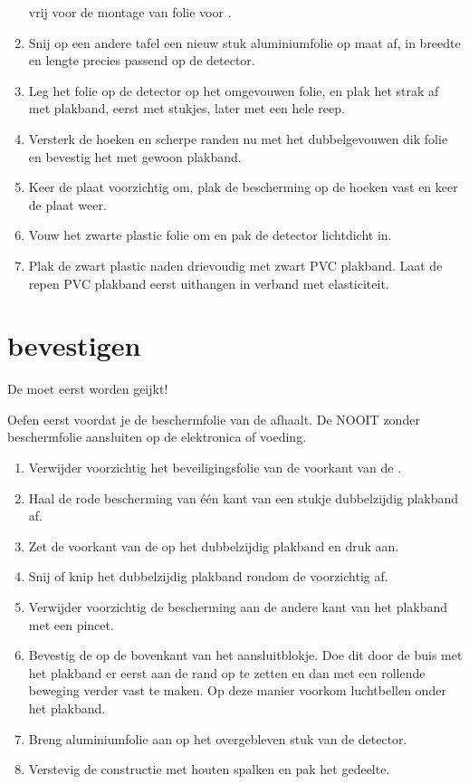 \begin{enumerate}
    vrij voor de montage van folie voor \pmt.
    \item Snij op een andere tafel een nieuw stuk aluminiumfolie op maat
    af, in breedte en lengte precies passend op de detector.
    \item Leg het folie op de detector op het omgevouwen folie, en plak
    het strak af met plakband, eerst met stukjes, later met een hele
    reep.
    \item Versterk de hoeken en scherpe randen nu met het dubbelgevouwen
    dik folie en bevestig het met gewoon plakband.
    \item Keer de plaat voorzichtig om, plak de bescherming op de hoeken
    vast en keer de plaat weer.
    \item Vouw het zwarte plastic folie om en pak de detector lichtdicht
    in.
    \item Plak de zwart plastic naden drievoudig met zwart PVC plakband.
    Laat de repen PVC plakband eerst uithangen in verband met
    elasticiteit.
\end{enumerate}


\section{\pmt bevestigen}

De \pmt moet eerst worden geijkt!

Oefen eerst voordat je de beschermfolie van de \pmt afhaalt. De \pmt
NOOIT zonder beschermfolie aansluiten op de elektronica of voeding.

\begin{enumerate}
    \item Verwijder voorzichtig het beveiligingsfolie van de voorkant
    van de \pmt.
    \item Haal de rode bescherming van één kant van een stukje
    dubbelzijdig plakband af.
    \item Zet de voorkant van de \pmt op het dubbelzijdig plakband en
    druk aan.
    \item Snij of knip het dubbelzijdig plakband rondom de \pmt
    voorzichtig af.
    \item Verwijder voorzichtig de bescherming aan de andere kant van
    het plakband met een pincet.
    \item Bevestig de \pmt op de bovenkant van het aansluitblokje. Doe
    dit door de buis met het plakband er eerst aan de rand op te zetten
    en dan met een rollende beweging verder vast te maken. Op deze
    manier voorkom luchtbellen onder het plakband.
    \item Breng aluminiumfolie aan op het overgebleven stuk van de
    detector.
    \item Verstevig de \pmt constructie met houten spalken en pak het
    \pmt gedeelte.
\end{enumerate}

